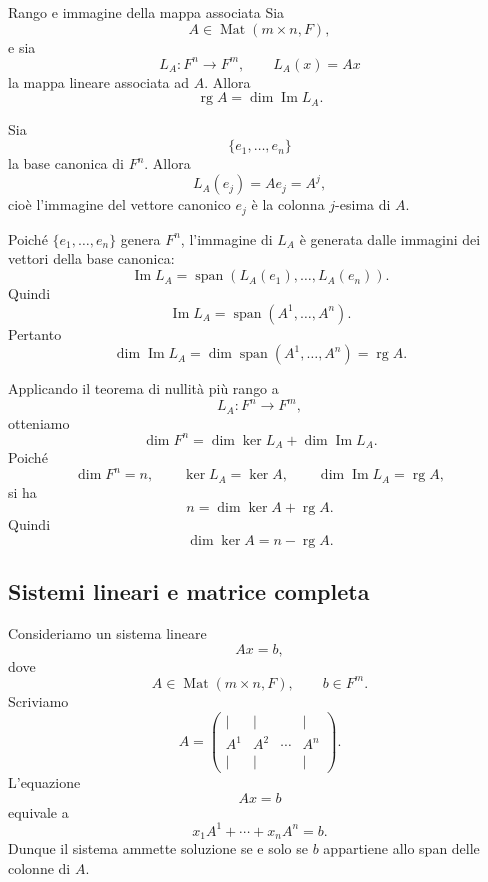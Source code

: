 \documentclass[a4paper]{article}
\begin{document}
\begin{snippetproposition}{Rango e immagine della mappa associata}
    Sia
    \[
        A\in\operatorname{Mat}(m\times n,F),
    \]
    e sia
    \[
        L_A:F^n\to F^m,
        \qquad
        L_A(x)=Ax
    \]
    la mappa lineare associata ad \(A\). Allora
    \[
        \operatorname{rg}A
        =
        \dim\operatorname{Im}L_A.
    \]
\end{snippetproposition}

\begin{snippetproof}{}
    Sia
    \[
        \{e_1,\ldots,e_n\}
    \]
    la base canonica di \(F^n\). Allora
    \[
        L_A(e_j)=Ae_j=A^j,
    \]
    cioè l'immagine del vettore canonico \(e_j\) è la colonna \(j\)-esima di \(A\).

    Poiché \(\{e_1,\ldots,e_n\}\) genera \(F^n\), l'immagine di \(L_A\) è generata dalle immagini dei vettori della base canonica:
    \[
        \operatorname{Im}L_A
        =
        \operatorname{span}(L_A(e_1),\ldots,L_A(e_n)).
    \]
    Quindi
    \[
        \operatorname{Im}L_A
        =
        \operatorname{span}(A^1,\ldots,A^n).
    \]
    Pertanto
    \[
        \dim\operatorname{Im}L_A
        =
        \dim\operatorname{span}(A^1,\ldots,A^n)
        =
        \operatorname{rg}A.
    \]
\end{snippetproof}

Applicando il teorema di nullità più rango a
\[
    L_A:F^n\to F^m,
\]
otteniamo
\[
    \dim F^n
    =
    \dim\ker L_A+\dim\operatorname{Im}L_A.
\]
Poiché
\[
    \dim F^n=n,
    \qquad
    \ker L_A=\ker A,
    \qquad
    \dim\operatorname{Im}L_A=\operatorname{rg}A,
\]
si ha
\[
    n=\dim\ker A+\operatorname{rg}A.
\]
Quindi
\[
    \dim\ker A=n-\operatorname{rg}A.
\]

\subsection{Sistemi lineari e matrice completa}

Consideriamo un sistema lineare
\[
    Ax=b,
\]
dove
\[
    A\in\operatorname{Mat}(m\times n,F),
    \qquad
    b\in F^m.
\]
Scriviamo
\[
    A=
    \begin{pmatrix}
        \vert & \vert & & \vert\\
        A^1 & A^2 & \cdots & A^n\\
        \vert & \vert & & \vert
    \end{pmatrix}.
\]
L'equazione
\[
    Ax=b
\]
equivale a
\[
    x_1A^1+\cdots+x_nA^n=b.
\]
Dunque il sistema ammette soluzione se e solo se \(b\) appartiene allo span delle colonne di \(A\).
\end{document}

